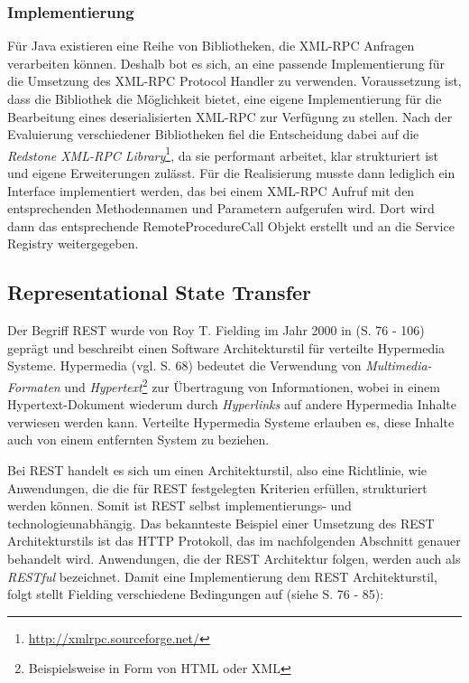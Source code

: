 \subsubsection{Implementierung}
Für Java existieren eine Reihe von Bibliotheken, die XML-RPC Anfragen verarbeiten
können. Deshalb bot es sich, an eine passende Implementierung für die Umsetzung
des XML-RPC Protocol Handler zu verwenden. Voraussetzung ist, dass die
Bibliothek die Möglichkeit bietet, eine eigene Implementierung für die
Bearbeitung eines deserialisierten XML-RPC zur Verfügung zu stellen. Nach der Evaluierung
verschiedener Bibliotheken fiel die Entscheidung dabei auf die \emph{Redstone
XML-RPC Library}\footnote{\url{http://xmlrpc.sourceforge.net/}}, da sie
performant arbeitet, klar strukturiert ist und eigene Erweiterungen zulässt. Für
die Realisierung musste dann lediglich ein Interface implementiert werden,
das bei einem XML-RPC Aufruf mit den entsprechenden Methodennamen und
Parametern aufgerufen wird. Dort wird dann das entsprechende
RemoteProcedureCall Objekt erstellt und an die Service Registry weitergegeben.

\subsection{Representational State Transfer}\label{subsec:rest}
Der Begriff \ac{REST} wurde von Roy T. Fielding im Jahr 2000 in
\cite{fielding:2000} (S. 76 - 106) geprägt und beschreibt einen Software
Architekturstil für verteilte Hypermedia Systeme. Hypermedia (vgl.
\cite{fielding:2000} S. 68) bedeutet die Verwendung von
\emph{Multimedia-Formaten} und \emph{Hypertext}\footnote{Beispielsweise in Form
von HTML oder XML} zur Übertragung von Informationen, wobei in einem
Hypertext-Dokument wiederum durch \emph{Hyperlinks} auf andere Hypermedia Inhalte
verwiesen werden kann. Verteilte Hypermedia Systeme erlauben es, diese Inhalte
auch von einem entfernten System zu beziehen.

Bei \ac{REST} handelt es sich um einen Architekturstil, also eine Richtlinie,
wie Anwendungen, die die für \ac{REST} festgelegten Kriterien erfüllen, strukturiert
werden können. Somit ist \ac{REST} selbst implementierungs- und
technologieunabhängig. Das bekannteste Beispiel einer Umsetzung des \ac{REST}
Architekturstils ist das \ac{HTTP} Protokoll, das im nachfolgenden Abschnitt
genauer behandelt wird. Anwendungen, die der \ac{REST} Architektur folgen,
werden auch als \emph{RESTful} bezeichnet. Damit eine Implementierung dem
\ac{REST} Architekturstil, folgt stellt Fielding verschiedene Bedingungen auf
(siehe \cite{fielding:2000} S. 76 - 85):

